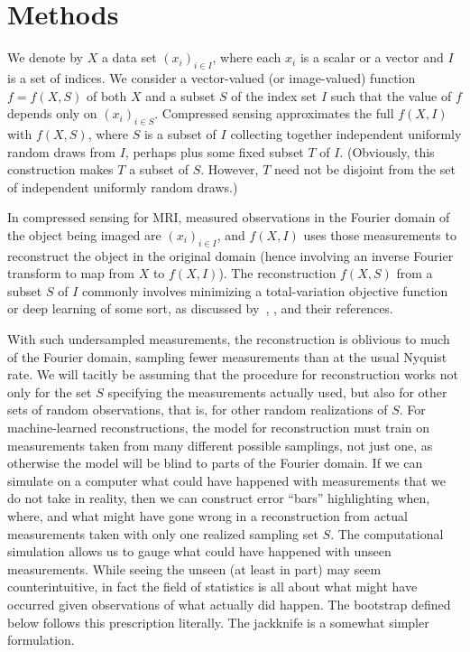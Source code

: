 \documentclass{article}
\begin{document}
\section{Methods}
\label{methods}

We denote by $X$ a data set $(x_i)_{i \in I}$,
where each $x_i$ is a scalar or a vector and $I$ is a set of indices.
We consider a vector-valued (or image-valued) function $f = f(X, S)$
of both $X$ and a subset $S$ of the index set $I$
such that the value of $f$ depends only on $(x_i)_{i \in S}$.
Compressed sensing approximates the full $f(X, I)$ with $f(X, S)$,
where $S$ is a subset of $I$ collecting together independent uniformly random
draws from $I$, perhaps plus some fixed subset $T$ of $I$.
(Obviously, this construction makes $T$ a subset of $S$. However,
$T$ need not be disjoint from the set of independent uniformly random draws.)

In compressed sensing for MRI, measured observations in the Fourier domain
of the object being imaged are $(x_i)_{i \in I}$, and $f(X, I)$ uses those
measurements to reconstruct the object in the original domain
(hence involving an inverse Fourier transform to map from $X$ to $f(X, I)$).
The reconstruction $f(X, S)$ from a subset $S$ of $I$ commonly involves
minimizing a total-variation objective function or deep learning of some sort,
as discussed by~\cite{tao-yang}, \cite{yang-zhang}, and their references.

With such undersampled measurements, the reconstruction is oblivious to much
of the Fourier domain, sampling fewer measurements
than at the usual Nyquist rate.
We will tacitly be assuming that the procedure for reconstruction works
not only for the set $S$ specifying the measurements actually used,
but also for other sets of random observations, that is,
for other random realizations of $S$.
For machine-learned reconstructions, the model for reconstruction must train
on measurements taken from many different possible samplings, not just one,
as otherwise the model will be blind to parts of the Fourier domain.
If we can simulate on a computer what could have happened with measurements
that we do not take in reality, then we can construct error ``bars''
highlighting when, where, and what might have gone wrong in a reconstruction
from actual measurements taken with only one realized sampling set $S$.
The computational simulation allows us to gauge what could have happened
with unseen measurements.
While seeing the unseen (at least in part) may seem counterintuitive,
in fact the field of statistics is all about what might have occurred
given observations of what actually did happen.
The bootstrap defined below follows this prescription literally.
The jackknife is a somewhat simpler formulation.
\end{document}

